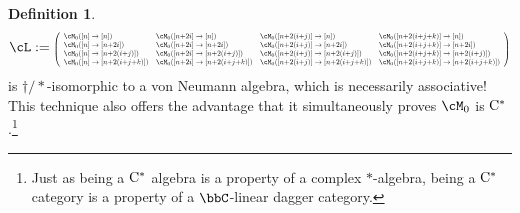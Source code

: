 \documentclass[11pt]{article}
\theoremstyle{plain}
\theoremstyle{definition}
\newtheorem{defn}[thm]{Definition}
\newcommand{\Cstar}{\rm{C^*}}
\begin{document}
\begin{defn}
$$
\cL:=
\resizebox{.95\hsize}{!}{$
\left(\begin{array}{llll}
\cM_0([n] \to[n])
&
\cM_0([n{+}2i] \to[n])
&
\cM_0([n{+}2(i{+}j)] \to[n])
&
\cM_0([n{+}2(i{+}j{+}k)] \to[n])
\\
\cM_0([n] \to[n{+}2i])
&
\cM_0([n{+}2i] \to[n{+}2i])
&
\cM_0([n{+}2(i{+}j)] \to[n{+}2i])
&
\cM_0([n{+}2(i{+}j{+}k)] \to[n{+}2i])
\\
\cM_0([n] \to[n{+}2(i{+}j)])
&
\cM_0([n{+}2i] \to[n{+}2(i{+}j)])
&
\cM_0([n{+}2(i{+}j)] \to[n{+}2(i{+}j)])
&
\cM_0([n{+}2(i{+}j{+}k)] \to[n{+}2(i{+}j)])
\\
\cM_0([n] \to[n{+}2(i{+}j{+}k)])
&
\cM_0([n{+}2i] \to[n{+}2(i{+}j{+}k)])
&
\cM_0([n{+}2(i{+}j)] \to[n{+}2(i{+}j{+}k)])
&
\cM_0([n{+}2(i{+}j{+}k)] \to[n{+}2(i{+}j{+}k)])
\end{array}\right)
$}
$$ 
is $\dag/*$-isomorphic to a von Neumann algebra, which is necessarily associative!
This technique also offers the advantage that it simultaneously proves $\cM_0$ is $\Cstar$.\footnote{
Just as being a $\Cstar$ algebra is a property of a complex $*$-algebra, being a $\Cstar$ category is a property of a $\bbC$-linear dagger category.
}


\end{defn}
\end{document}
